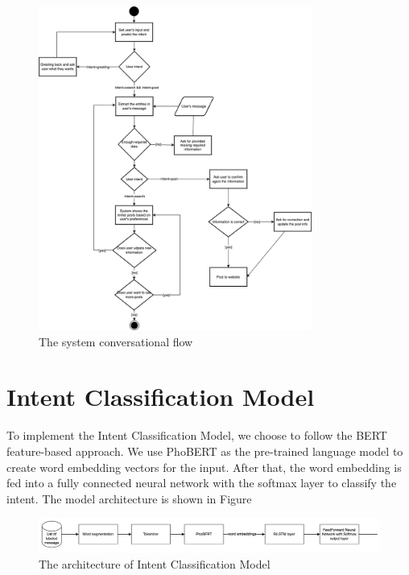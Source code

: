 \begin{figure}[ht]
    \centering
    \includegraphics[width=0.8\textwidth]{Images/7.System_Modeling/conversational_flow.png}
    \caption{The system conversational flow}
    \label{fig:conversational-flow}
\end{figure}

\section{Intent Classification Model}
\label{sec:intent-classification-model}
To implement the Intent Classification Model, we choose to follow the BERT feature-based approach. We use PhoBERT as the pre-trained language model to create word embedding vectors for the input. After that, the word embedding is fed into a fully connected neural network with the softmax layer to classify the intent. The model architecture is shown in Figure

\begin{figure}[ht]
    \centering
    \includegraphics[width=\textwidth]{Images/7.System_Modeling/intent_classifier_architecture.png}
    \caption{The architecture of Intent Classification Model}
    \label{fig:intent-classification-model}
\end{figure}

